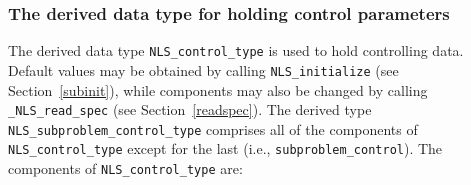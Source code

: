 \documentclass{galahad}
\newcommand{\packagename}{NLS}
\newcommand{\fullpackagename}{\libraryname\_\packagename}
\begin{document}

\subsubsection{The derived data type for holding control
 parameters}\label{typecontrol}
The derived data type
{\tt \packagename\_control\_type}
is used to hold controlling data. Default values may be obtained by calling
{\tt \packagename\_initialize}
(see Section~\ref{subinit}),
while components may also be changed by calling
{\tt \fullpackagename\_read\-\_spec}
(see Section~\ref{readspec}).
The derived type {\tt \packagename\_subproblem\_control\_type}
comprises all of the components of {\tt \packagename\_control\_type}
except for the last (i.e., {\tt subproblem\_control}).
The components of
{\tt \packagename\_control\_type}
are:
\end{document}
